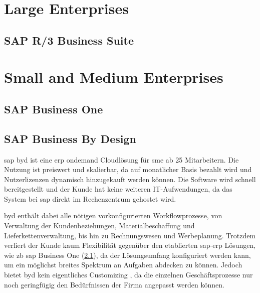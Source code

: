 \section{Large Enterprises}
\subsection{SAP R/3 Business Suite}
\label{sec:business-suite}

\section{Small and Medium Enterprises}
\subsection{SAP Business One}
\label{sec:business-one}

\subsection{SAP Business By Design}
\label{sec:byd}

\gls{sap} \gls{byd} ist eine \gls{erp} \gls{ondemand} Cloudlösung für \gls{sme} ab 25 Mitarbeitern. Die Nutzung ist preiswert und skalierbar, da auf monatlicher Basis bezahlt wird und Nutzerlizenzen dynamisch hinzugekauft werden können. Die Software wird schnell bereitgestellt und der Kunde hat keine weiteren IT-Aufwendungen, da das System bei \gls{sap} direkt im Rechenzentrum gehostet wird.

\gls{byd} enthält dabei alle nötigen vorkonfigurierten Workflowprozesse, von Verwaltung der Kundenbeziehungen, Materialbeschaffung und Lieferkettenverwaltung, bis hin zu Rechnungswesen und Werbeplanung. Trotzdem verliert der Kunde kaum Flexibilität gegenüber den etablierten \gls{sap}-\gls{erp} Lösungen, wie \gls{zb} \gls{sap} Business One (\ref{sec:business-one}), da der Lösungsumfang konfiguriert werden kann, um ein möglichst breites Spektrum an Aufgaben abdecken zu können. Jedoch bietet \gls{byd} kein eigentliches Customizing \cite{ERP4Students}, da die einzelnen Geschäftsprozesse nur noch geringfügig den Bedürfnissen der Firma angepasst werden können.

